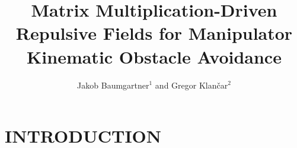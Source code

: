 \documentclass[letterpaper, 10 pt, conference]{ieeeconf}  %
\title{\LARGE \bf
Matrix Multiplication-Driven Repulsive Fields for Manipulator Kinematic Obstacle Avoidance
}
\author{
	Jakob Baumgartner$^{1}$ and Gregor Klančar$^{2}$%
}
\begin{document}
\maketitle
\thispagestyle{empty}
\pagestyle{empty}


\begin{abstract}



\end{abstract}



\section{INTRODUCTION}

%
\end{document}
